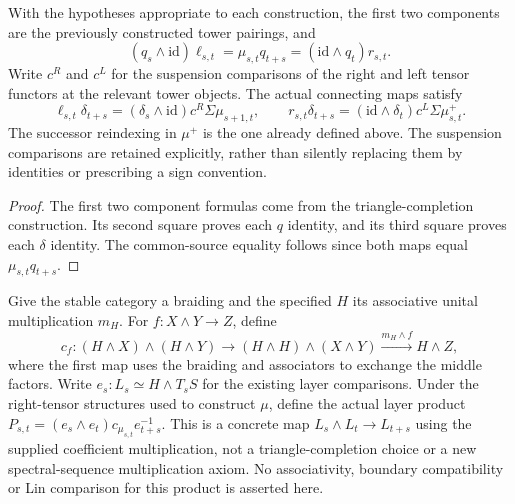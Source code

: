 \begin{proposition}
  \label{prop:h6-mixed-layer-pairing-boundaries}
  \leanok
  With the hypotheses appropriate to each construction, the first two
  components are the previously constructed tower pairings, and
  \[
    (q_s\wedge\mathrm{id})\ell_{s,t}
      =\mu_{s,t}q_{t+s}
      =(\mathrm{id}\wedge q_t)r_{s,t}.
  \]
  Write $c^R$ and $c^L$ for the suspension comparisons of the right and
  left tensor functors at the relevant tower objects. The actual connecting
  maps satisfy
  \[
    \ell_{s,t}\delta_{t+s}
      =(\delta_s\wedge\mathrm{id})c^R\Sigma\mu_{s+1,t},
    \qquad
    r_{s,t}\delta_{t+s}
      =(\mathrm{id}\wedge\delta_t)c^L\Sigma\mu^+_{s,t}.
  \]
  The successor reindexing in $\mu^+$ is the one already defined above.
  The suspension comparisons are retained explicitly, rather than silently
  replacing them by identities or prescribing a sign convention.
\end{proposition}
\begin{proof}
  The first two component formulas come from the triangle-completion
  construction. Its second square proves each $q$ identity, and its third
  square proves each $\delta$ identity. The common-source equality follows
  since both maps equal $\mu_{s,t}q_{t+s}$.
  \leanok
\end{proof}

\begin{definition}
  \label{def:h6-coefficient-layer-product}
  \leanok
  Give the stable category a braiding and the specified $H$ its associative
  unital multiplication $m_H$. For $f:X\wedge Y\to Z$, define
  \[
    c_f:(H\wedge X)\wedge(H\wedge Y)
       \longrightarrow(H\wedge H)\wedge(X\wedge Y)
       \xrightarrow{m_H\wedge f}H\wedge Z,
  \]
  where the first map uses the braiding and associators to exchange the
  middle factors. Write $e_s:L_s\simeq H\wedge T_sS$ for the existing layer
  comparisons. Under the right-tensor structures used to construct $\mu$,
  define the actual layer product
  $P_{s,t}=(e_s\wedge e_t)c_{\mu_{s,t}}e_{t+s}^{-1}$.
  This is a concrete map $L_s\wedge L_t\to L_{t+s}$ using the supplied
  coefficient multiplication, not a triangle-completion choice or a new
  spectral-sequence multiplication axiom. No associativity, boundary
  compatibility or Lin comparison for this product is asserted here.
\end{definition}

